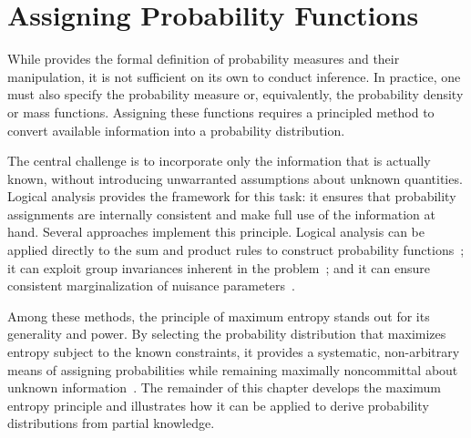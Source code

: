 \chapter{Assigning Probability Functions}
While  provides the formal definition of probability measures and their manipulation, it is not sufficient on its own to conduct inference. In practice, one must also specify the probability measure or, equivalently, the probability density or mass functions. Assigning these functions requires a principled method to convert available information into a probability distribution.

The central challenge is to incorporate only the information that is actually known, without introducing unwarranted assumptions about unknown quantities. Logical analysis provides the framework for this task: it ensures that probability assignments are internally consistent and make full use of the information at hand. Several approaches implement this principle. Logical analysis can be applied directly to the sum and product rules to construct probability functions~\citep{jaynes_11}; it can exploit group invariances inherent in the problem~\citep{jaynes_16}; and it can ensure consistent marginalization of nuisance parameters~\citep{jaynes_21}.

Among these methods, the principle of maximum entropy\citep{Jaynes1957} stands out for its generality and power. By selecting the probability distribution that maximizes entropy subject to the known constraints, it provides a systematic, non-arbitrary means of assigning probabilities while remaining maximally noncommittal about unknown information~\cite{zellner_bayesian_inference, jaynes_16, jaynes_19, shore_17, shore_18}. The remainder of this chapter develops the maximum entropy principle and illustrates how it can be applied to derive probability distributions from partial knowledge.

